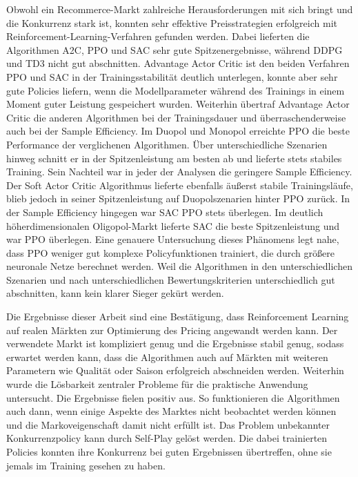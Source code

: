 Obwohl ein Recommerce-Markt zahlreiche Herausforderungen mit sich bringt und die Konkurrenz stark ist, konnten sehr effektive Preisstrategien erfolgreich mit Reinforcement-Learning-Verfahren gefunden werden.
Dabei lieferten die Algorithmen A2C, PPO und SAC sehr gute Spitzenergebnisse, während DDPG und TD3 nicht gut abschnitten.
Advantage Actor Critic ist den beiden Verfahren PPO und SAC in der Trainingsstabilität deutlich unterlegen, konnte aber sehr gute Policies liefern, wenn die Modellparameter während des Trainings in einem Moment guter Leistung gespeichert wurden.
Weiterhin übertraf Advantage Actor Critic die anderen Algorithmen bei der Trainingsdauer und überraschenderweise auch bei der Sample Efficiency.
Im Duopol und Monopol erreichte PPO die beste Performance der verglichenen Algorithmen.
Über unterschiedliche Szenarien hinweg schnitt er in der Spitzenleistung am besten ab und lieferte stets stabiles Training.
Sein Nachteil war in jeder der Analysen die geringere Sample Efficiency.
Der Soft Actor Critic Algorithmus lieferte ebenfalls äußerst stabile Trainingsläufe, blieb jedoch in seiner Spitzenleistung auf Duopolszenarien hinter PPO zurück.
In der Sample Efficiency hingegen war SAC PPO stets überlegen.
Im deutlich höherdimensionalen Oligopol-Markt lieferte SAC die beste Spitzenleistung und war PPO überlegen.
Eine genauere Untersuchung dieses Phänomens legt nahe, dass PPO weniger gut komplexe Policyfunktionen trainiert, die durch größere neuronale Netze berechnet werden.
Weil die Algorithmen in den unterschiedlichen Szenarien und nach unterschiedlichen Bewertungskriterien unterschiedlich gut abschnitten, kann kein klarer Sieger gekürt werden.

Die Ergebnisse dieser Arbeit sind eine Bestätigung, dass Reinforcement Learning auf realen Märkten zur Optimierung des Pricing angewandt werden kann.
Der verwendete Markt ist kompliziert genug und die Ergebnisse stabil genug, sodass erwartet werden kann, dass die Algorithmen auch auf Märkten mit weiteren Parametern wie Qualität oder Saison erfolgreich abschneiden werden.
Weiterhin wurde die Lösbarkeit zentraler Probleme für die praktische Anwendung untersucht.
Die Ergebnisse fielen positiv aus.
So funktionieren die Algorithmen auch dann, wenn einige Aspekte des Marktes nicht beobachtet werden können und die Markoveigenschaft damit nicht erfüllt ist.
Das Problem unbekannter Konkurrenzpolicy kann durch Self-Play gelöst werden.
Die dabei trainierten Policies konnten ihre Konkurrenz bei guten Ergebnissen übertreffen, ohne sie jemals im Training gesehen zu haben.

